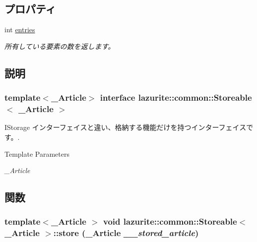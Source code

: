 \subsection*{プロパティ}
\begin{DoxyCompactItemize}
\item 
int \hyperlink{interfacelazurite_1_1common_1_1_storeable_3_01___article_01_4_a3af6673c4d90f17fc0bf623319962692}{entries}
\begin{DoxyCompactList}\small\item\em 所有している要素の数を返します。 \item\end{DoxyCompactList}\end{DoxyCompactItemize}


\subsection{説明}
\subsubsection*{template$<$\_\-Article$>$ interface lazurite::common::Storeable$<$ \_\-Article $>$}

IStorage インターフェイスと違い、格納する機能だけを持つインターフェイスです。. 
\begin{DoxyTemplParams}{Template Parameters}
\item[{\em \_\-Article}]\end{DoxyTemplParams}


\subsection{関数}
\hypertarget{interfacelazurite_1_1common_1_1_storeable_3_01___article_01_4_ac97bf94535cb939fd12d123afe95fcd4}{
\subsubsection[{store}]{\setlength{\rightskip}{0pt plus 5cm}template$<$\_\-Article $>$ void lazurite::common::Storeable$<$ \_\-Article $>$::store (\_\-Article {\em \_\-\_\-stored\_\-article})}}
\label{interfacelazurite_1_1common_1_1_storeable_3_01___article_01_4_ac97bf94535cb939fd12d123afe95fcd4}



